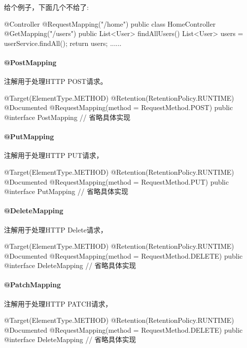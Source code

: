 给个例子，下面几个不给了:

\begin{Java}
@Controller
@RequestMapping("/home")
public class HomeController {
    @GetMapping("/users")
    public List<User> findAllUsers() {
        List<User> users = userService.findAll();
        return users;
    }
    ......
}
\end{Java}

\paragraph*{@PostMapping}

注解用于处理HTTP POST请求。

\begin{Java}
@Target(ElementType.METHOD)
@Retention(RetentionPolicy.RUNTIME)
@Documented
@RequestMapping(method = RequestMethod.POST)
public @interface PostMapping {
    // 省略具体实现
}
\end{Java}

\paragraph*{@PutMapping}

注解用于处理HTTP PUT请求，

\begin{Java}
@Target(ElementType.METHOD)
@Retention(RetentionPolicy.RUNTIME)
@Documented
@RequestMapping(method = RequestMethod.PUT)
public @interface PutMapping {
    // 省略具体实现
}
\end{Java}

\paragraph*{@DeleteMapping}

注解用于处理HTTP Delete请求，

\begin{Java}
@Target(ElementType.METHOD)
@Retention(RetentionPolicy.RUNTIME)
@Documented
@RequestMapping(method = RequestMethod.DELETE)
public @interface DeleteMapping {
    // 省略具体实现
}
\end{Java}

\paragraph*{@PatchMapping}

注解用于处理HTTP PATCH请求，

\begin{Java}
@Target(ElementType.METHOD)
@Retention(RetentionPolicy.RUNTIME)
@Documented
@RequestMapping(method = RequestMethod.DELETE)
public @interface DeleteMapping {
    // 省略具体实现
}
\end{Java}

